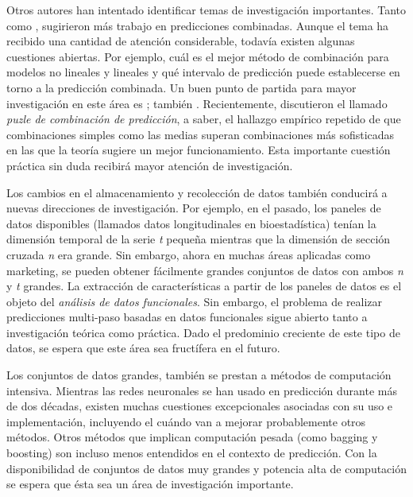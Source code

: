\documentclass{llncs}
\begin{document}
Otros autores han intentado identificar temas de investigación importantes. Tanto \cite{deGooijer1990449} como \cite{Clements20031}, sugirieron más trabajo en predicciones combinadas. Aunque el tema ha recibido una cantidad de atención considerable, todavía existen algunas cuestiones abiertas. Por ejemplo, cuál es el mejor método de combinación para modelos no lineales y lineales y qué intervalo de predicción puede establecerse en torno a la predicción combinada. Un buen punto de partida para mayor investigación en este área es \cite{Terasvirta2006}; también \cite{Armstrong2001}. Recientemente, \cite{Stock2004405} discutieron el llamado \emph{puzle de combinación de predicción}, a saber, el hallazgo empírico repetido de que combinaciones simples como las medias superan combinaciones más sofisticadas en las que la teoría sugiere un mejor funcionamiento. Esta importante cuestión práctica sin duda recibirá mayor atención de investigación.

Los cambios en el almacenamiento y recolección de datos también conducirá a nuevas direcciones de investigación. Por ejemplo, en el pasado, los paneles de datos disponibles (llamados datos longitudinales en bioestadística) tenían la dimensión temporal de la serie \emph{t} pequeña mientras que la dimensión de sección cruzada \emph{n} era grande. Sin embargo, ahora en muchas áreas aplicadas como marketing, se pueden obtener fácilmente grandes conjuntos de datos con ambos \emph{n} y \emph{t} grandes. La extracción de características a partir de los paneles de datos es el objeto del \emph{análisis de datos funcionales}. Sin embargo, el problema de realizar predicciones multi-paso basadas en datos funcionales sigue abierto tanto a investigación teórica como práctica. Dado el predominio creciente de este tipo de datos, se espera que este área sea fructífera en el futuro.

Los conjuntos de datos grandes, también se prestan a métodos de computación intensiva. Mientras las redes neuronales se han usado en predicción durante más de dos décadas, existen muchas cuestiones excepcionales asociadas con su uso e implementación, incluyendo el cuándo van a mejorar probablemente otros métodos. Otros métodos que implican computación pesada (como bagging y boosting) son incluso menos entendidos en el contexto de predicción. Con la disponibilidad de conjuntos de datos muy grandes y potencia alta de computación se espera que ésta sea un área de investigación importante.
\end{document}
